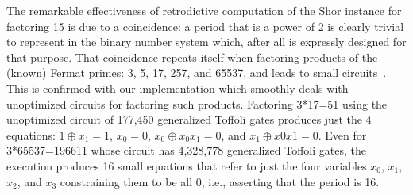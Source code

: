 \documentclass[sigplan,screen]{acmart}
\theoremstyle{definition}
\begin{document}
The remarkable effectiveness of retrodictive computation of the Shor
instance for factoring 15 is due to a coincidence: a period that is a
power of 2 is clearly trivial to represent in the binary number system
which, after all is expressly designed for that purpose. That
coincidence repeats itself when factoring products of the (known)
Fermat primes: 3, 5, 17, 257, and 65537, and leads to small
circuits~\cite{shorFermat}. This is confirmed with our implementation
which smoothly deals with unoptimized circuits for factoring such
products. Factoring 3*17=51 using the unoptimized circuit of 177,450
generalized Toffoli gates produces just the 4 equations: $1 \oplus x_1
= 1$, $x_0 = 0$, $x_0 \oplus x_0x_1 = 0$, and $x_1 \oplus x0x1 =
0$. Even for 3*65537=196611 whose circuit has 4,328,778 generalized
Toffoli gates, the execution produces 16 small equations that refer to
just the four variables $x_0$, $x_1$, $x_2$, and $x_3$ constraining
them to be all 0, i.e., asserting that the period is 16.
\end{document}
